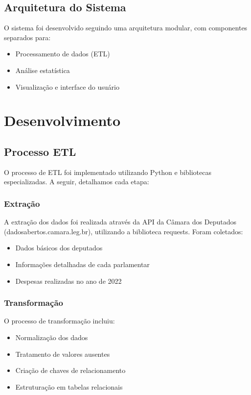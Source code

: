 \documentclass[12pt,a4paper]{article}
\begin{document}
\subsection{Arquitetura do Sistema}
O sistema foi desenvolvido seguindo uma arquitetura modular, com componentes separados para:
\begin{itemize}
    \item Processamento de dados (ETL)
    \item Análise estatística
    \item Visualização e interface do usuário
\end{itemize}

\section{Desenvolvimento}
\subsection{Processo ETL}
O processo de ETL foi implementado utilizando Python e bibliotecas especializadas. A seguir, detalhamos cada etapa:

\subsubsection{Extração}
A extração dos dados foi realizada através da API da Câmara dos Deputados (dadosabertos.camara.leg.br), utilizando a biblioteca requests. Foram coletados:
\begin{itemize}
    \item Dados básicos dos deputados
    \item Informações detalhadas de cada parlamentar
    \item Despesas realizadas no ano de 2022
\end{itemize}

\subsubsection{Transformação}
O processo de transformação incluiu:
\begin{itemize}
    \item Normalização dos dados
    \item Tratamento de valores ausentes
    \item Criação de chaves de relacionamento
    \item Estruturação em tabelas relacionais
\end{itemize}
\end{document}
